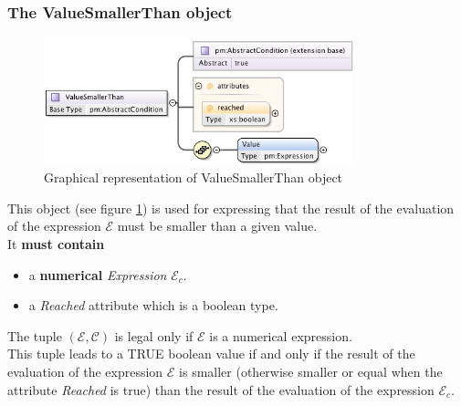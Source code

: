 \documentclass[a4paper,11pt] {ivoa}
\begin{document}
\subsubsection{The ValueSmallerThan object}
\begin{figure}[htbp]
\begin{center}
\includegraphics[width=0.8\textwidth]{pictures/ValueSmallerThan.jpg} 
\caption{Graphical representation of ValueSmallerThan object}
\label{Pic-ValueSmallerThan}
\end{center}
\end{figure}
This object (see figure \ref{Pic-ValueSmallerThan}) is used for expressing that the result of the
evaluation of the expression $\mathcal E$ must be smaller than a given value.\\
It {\bf must contain}
\begin{itemize}
\item a  {\bf numerical} {\it Expression} $\mathcal E_c$. 
\item a  {\it Reached} attribute which is a boolean type.
\end{itemize}
The tuple $(\mathcal E, \mathcal C)$ is legal only if $\mathcal E$ is a numerical expression.\\
This tuple leads to a TRUE boolean value if and only if the result of the evaluation of the
expression $\mathcal E$ is smaller (otherwise smaller or equal when the  attribute {\it Reached} is
true) than the result of the evaluation of the expression $\mathcal E_c$.
\end{document}
